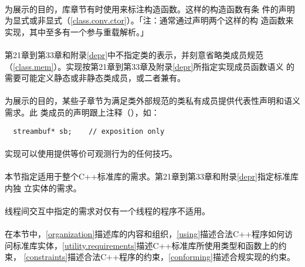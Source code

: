 \paragraph{}
为展示的目的，库章节有时使用来标注构造函数。这样的构造函数有条
件的声明为显式或非显式（\ref{class.conv.ctor}）。「注：通常通过声明两个这样的构
造函数来实现，其中至多有一个参与重载解析。」

\paragraph{}
第21章到第33章和附录\ref{depr}中不指定类的表示，并刻意省略类成员规范
（\ref{class.mem}）。实现按第21章到第33章及附录\ref{depr}所指定实现成员函数语义
的需要可能定义静态或非静态类成员，或二者兼有。

\paragraph{}
为展示的目的，某些子章节为满足类外部规范的类私有成员提供代表性声明和语义需求。此
类成员的声明跟上注释（），如：
\begin{lstlisting}
  streambuf* sb;    // exposition only
\end{lstlisting}

\paragraph{}
实现可以使用提供等价可观测行为的任何技巧。

\paragraph{}
本节指定适用于整个C++标准库的需求。第21章到第33章和附录\ref{depr}指定标准库内独
立实体的需求。

\paragraph{}
线程间交互中指定的需求对仅有一个线程的程序不适用。

\paragraph{}
在本节中，\ref{organization}描述库的内容和组织，\ref{using}描述合法C++程序如何访
问标准库实体，\ref{utility.requirements}描述C++标准库所使用类型和函数上的约束，
\ref{constraints}描述合法C++程序的约束，\ref{conforming}描述合规实现的约束。

